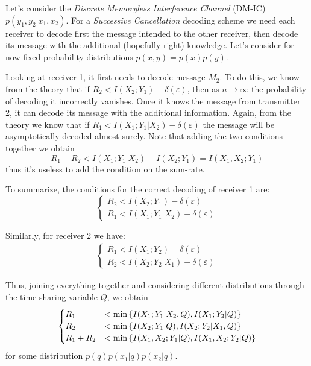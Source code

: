 
Let's consider the \textit{Discrete Memoryless Interference Channel} (DM-IC) $p(y_1,y_2|x_1,x_2)$. For a \textit{Successive Cancellation} decoding scheme we need each receiver to decode first the message intended to the other receiver, then decode its message with the additional (hopefully right) knowledge. Let's consider for now fixed probability distributions $p(x,y)=p(x)p(y)$.

Looking at receiver 1, it first needs to decode message $M_2$. To do this, we know from the theory that if $R_2 < I(X_2;Y_1) - \delta(\varepsilon)$, then as $n \rightarrow \infty$ the probability of decoding it incorrectly vanishes. Once it knows the message from transmitter 2, it can decode its message with the additional information. Again, from the theory we know that if $R_1 < I(X_1;Y_1|X_2) - \delta(\varepsilon)$ the message will be asymptotically decoded almost surely. Note that adding the two conditions together we obtain
%
\begin{equation}
R_1+R_2 < I(X_1;Y_1|X_2) + I(X_2;Y_1) = I(X_1,X_2;Y_1)
\end{equation}
%
thus it's useless to add the condition on the sum-rate.

To summarize, the conditions for the correct decoding of receiver 1 are:
%
\begin{equation}
\begin{cases}
	R_2 < I(X_2;Y_1) - \delta(\varepsilon)\\
	R_1 < I(X_1;Y_1|X_2) - \delta(\varepsilon) 
\end{cases}
\end{equation}

Similarly, for receiver 2 we have:
%
\begin{eqnarray}
\begin{cases}
	R_1 < I(X_1;Y_2) - \delta(\varepsilon)\\
	R_2 < I(X_2;Y_2|X_1) - \delta(\varepsilon)
\end{cases}
\end{eqnarray}

Thus, joining everything together and considering different distributions through the time-sharing variable $Q$, we obtain
%
\begin{equation}
\begin{cases}
	R_1 &< \min \qty{ I(X_1;Y_1|X_2,Q),I(X_1;Y_2|Q) }\\
	R_2 &< \min \qty{ I(X_2;Y_1|Q), I(X_2;Y_2|X_1,Q) }\\
	R_1+R_2 &< \min \qty{ I(X_1,X_2;Y_1|Q), I(X_1,X_2;Y_2|Q) }
\end{cases}
\label{eq:succ_canc_bound}
\end{equation}
%
for some distribution $p(q)p(x_1|q)p(x_2|q)$.

